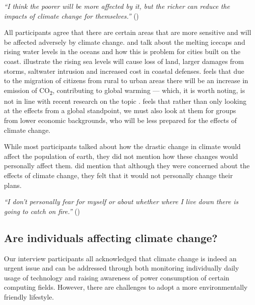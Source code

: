     \begin{quoting}
        \textit{``I think the poorer will be more affected by it, but the richer can reduce the impacts of climate change for themselves.''} ()
    \end{quoting}

    All participants agree that there are certain areas that are more sensitive and will be affected adversely by climate change.  and  talk about the melting icecaps and rising water levels in the oceans and how this is problem for cities built on the coast. \citet{hitz2004estimating} illustrate the rising sea levels will cause loss of land, larger damages from storms, saltwater intrusion and increased cost in coastal defenses.  feels that due to the migration of citizens from rural to urban areas there will be an increase in emission of CO\textsubscript{2}, contributing to global warming --- which, it is worth noting, is not in line with recent research on the topic \cite{castells2020density}.  feels that rather than only looking at the effects from a global standpoint, we must also look at them for groups from lower economic backgrounds, who will be less prepared for the effects of climate change.

    While most participants talked about how the drastic change in climate would affect the population of earth, they did not mention how these changes would personally affect them.  did mention that although they were concerned about the effects of climate change, they felt that it would not personally change their plans.
    
    
    \begin{quoting}
        \textit{``I don't personally fear for myself or about whether where I live down there is going to catch on fire.''} ()
    \end{quoting}
    
    
    
    \subsection{Are individuals affecting climate change?}
    
    Our interview participants all acknowledged that climate change is indeed an urgent issue and can be addressed through both monitoring individually daily usage of technology and raising awareness of power consumption of certain computing fields. However, there are challenges to adopt a more environmentally friendly lifestyle.
    
